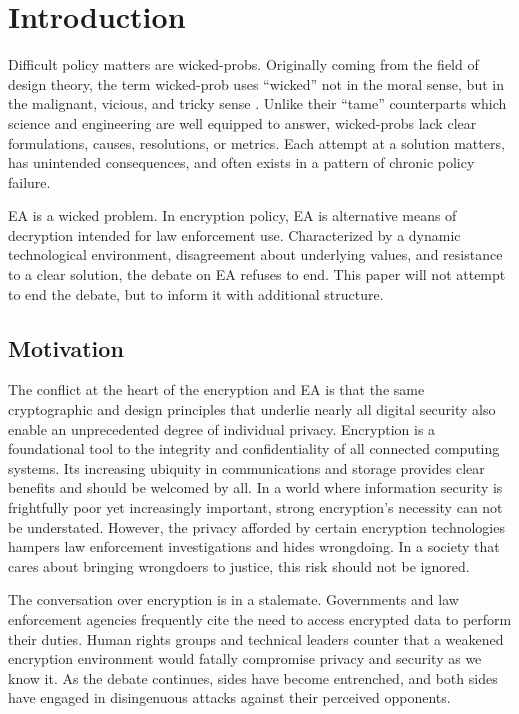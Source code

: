 \chapter{Introduction}
\label{chap-introduction}

Difficult policy matters are \acp{wicked-prob}. Originally coming from the field of design theory, the term
\ac{wicked-prob} uses ``wicked'' not in the moral sense, but in the malignant, vicious, and tricky sense
\cite{rittel_dilemmas_1973}. Unlike their ``tame'' counterparts which science and engineering are well equipped to
answer, \acp{wicked-prob} lack clear formulations, causes, resolutions, or metrics. Each attempt at a solution matters,
has unintended consequences, and often exists in a pattern of chronic policy failure.

\Acl{EA} is a wicked problem. In encryption policy, \ac{EA} is alternative means of decryption intended for law
enforcement use. Characterized by a dynamic technological environment, disagreement about underlying values, and
resistance to a clear solution, the debate on \acl{EA} refuses to end. This paper will not attempt to end the debate,
but to inform it with additional structure.


\section{Motivation}
\label{sec-motivation}

The conflict at the heart of the encryption and \acl{EA} is that the same cryptographic and design principles that
underlie nearly all digital security also enable an unprecedented degree of individual privacy. Encryption is a
foundational tool to the integrity and confidentiality of all connected computing systems. Its increasing ubiquity in
communications and storage provides clear benefits and should be welcomed by all. In a world where information security
is frightfully poor yet increasingly important, strong encryption's necessity can not be understated. However, the
privacy afforded by certain encryption technologies hampers law enforcement investigations and hides wrongdoing. In a
society that cares about bringing wrongdoers to justice, this risk should not be ignored.

The conversation over encryption is in a stalemate. Governments and law enforcement agencies frequently cite the need to
access encrypted data to perform their duties. Human rights groups and technical leaders counter that a weakened
encryption environment would fatally compromise privacy and security as we know it. As the debate continues, sides have
become entrenched, and both sides have engaged in disingenuous attacks against their perceived opponents.


